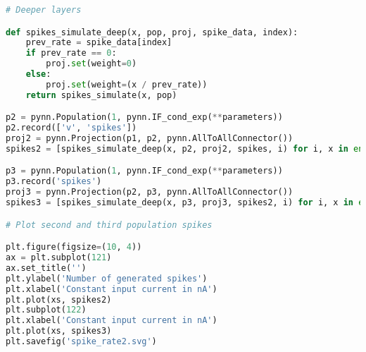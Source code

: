 \begin{lstlisting}[language=Python]
# Deeper layers

def spikes_simulate_deep(x, pop, proj, spike_data, index):
    prev_rate = spike_data[index]
    if prev_rate == 0:
        proj.set(weight=0)
    else:
        proj.set(weight=(x / prev_rate))
    return spikes_simulate(x, pop)

p2 = pynn.Population(1, pynn.IF_cond_exp(**parameters))
p2.record(['v', 'spikes'])
proj2 = pynn.Projection(p1, p2, pynn.AllToAllConnector())
spikes2 = [spikes_simulate_deep(x, p2, proj2, spikes, i) for i, x in enumerate(xs)]

p3 = pynn.Population(1, pynn.IF_cond_exp(**parameters))
p3.record('spikes')
proj3 = pynn.Projection(p2, p3, pynn.AllToAllConnector())
spikes3 = [spikes_simulate_deep(x, p3, proj3, spikes2, i) for i, x in enumerate(xs)]

# Plot second and third population spikes

plt.figure(figsize=(10, 4))
ax = plt.subplot(121)
ax.set_title('')
plt.ylabel('Number of generated spikes')
plt.xlabel('Constant input current in nA')
plt.plot(xs, spikes2)
plt.subplot(122)
plt.xlabel('Constant input current in nA')
plt.plot(xs, spikes3)
plt.savefig('spike_rate2.svg')

\end{lstlisting}
